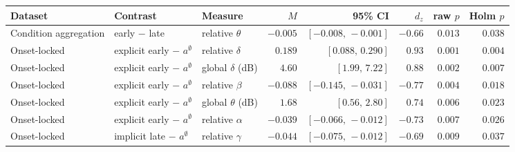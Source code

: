 \begin{tabular}{@{}l l l r r r r r@{}}
\toprule
Dataset & Contrast & Measure & \(M\) & 95\% CI & \(d_z\) & raw \(p\) & Holm \(p\) \\
\midrule
Condition aggregation & early \(-\) late & relative \(\theta\) & \(-0.005\) & \([-0.008,\,-0.001]\) & \(-0.66\) & \(0.013\) & \(0.038\) \\
\midrule
Onset-locked & explicit early \(-\) \(a^{\emptyset}\) & relative \(\delta\) & \(0.189\) & \([0.088,\,0.290]\) & \(0.93\) & \(0.001\) & \(0.004\) \\
Onset-locked & explicit early \(-\) \(a^{\emptyset}\) & global \(\delta\) (dB) & \(4.60\) & \([1.99,\,7.22]\) & \(0.88\) & \(0.002\) & \(0.007\) \\
Onset-locked & explicit early \(-\) \(a^{\emptyset}\) & relative \(\beta\) & \(-0.088\) & \([-0.145,\,-0.031]\) & \(-0.77\) & \(0.004\) & \(0.018\) \\
Onset-locked & explicit early \(-\) \(a^{\emptyset}\) & global \(\theta\) (dB) & \(1.68\) & \([0.56,\,2.80]\) & \(0.74\) & \(0.006\) & \(0.023\) \\
Onset-locked & explicit early \(-\) \(a^{\emptyset}\) & relative \(\alpha\) & \(-0.039\) & \([-0.066,\,-0.012]\) & \(-0.73\) & \(0.007\) & \(0.026\) \\
Onset-locked & implicit late \(-\) \(a^{\emptyset}\) & relative \(\gamma\) & \(-0.044\) & \([-0.075,\,-0.012]\) & \(-0.69\) & \(0.009\) & \(0.037\) \\
\bottomrule
\end{tabular}
